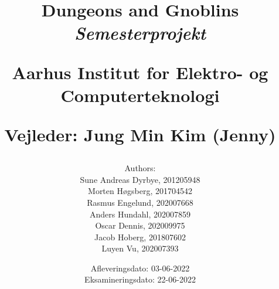 \newcommand{\authorName}{}
\newcommand{\titleName}{Dungeons and Gnoblins}
\newcommand{\subject}{Semesterprojekt}
\newcommand{\vejleder}{Vejleder: Jung Min Kim (Jenny)}
\newcommand{\institute}{Aarhus Institut for Elektro- og Computerteknologi}
\begin{titlepage}
  \centering
    \title
    {
      \Huge \textbf{\titleName}\\
      \scale{\numberSQRTTWO}{\vspace{\sol pt}}
      \LARGE \textit{\subject}
      \scale{\numberSQRTTWO}{\rule{\linewidth}{\sol pt}}

      \textbf{\institute}

      \vejleder

      \author
    {
      \LARGE Authors: \\
      Sune Andreas Dyrbye, 201205948 \\
      Morten Høgsberg, 201704542 \\
      Rasmus Engelund, 202007668 \\
      Anders Hundahl, 202007859 \\
      Oscar Dennis, 202009975 \\
      Jacob Hoberg, 201807602 \\
      Luyen Vu, 202007393 \\
    }
      \date{
        \LARGE Afleveringsdato: 03-06-2022 \\
        \LARGE Eksamineringsdato: 22-06-2022
      }
    }
\end{titlepage}
